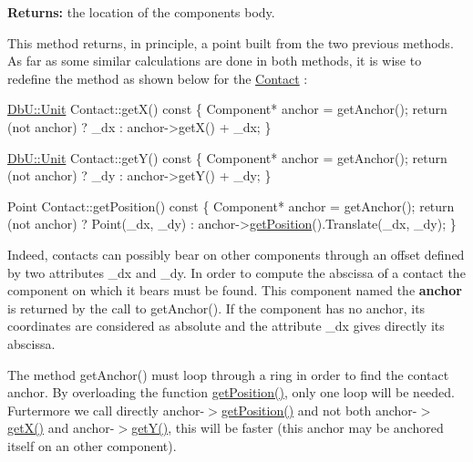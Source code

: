 {\bfseries Returns\+:} the location of the component\textquotesingle{}s body.

This method returns, in principle, a point built from the two previous methods. As far as some similar calculations are done in both methods, it is wise to redefine the method as shown below for the \hyperlink{classHurricane_1_1Contact}{Contact} \+: 
\begin{DoxyCode}
\hyperlink{group__DbUGroup_ga4fbfa3e8c89347af76c9628ea06c4146}{DbU::Unit} Contact::getX()\textcolor{keyword}{ const}
\textcolor{keyword}{}\{
  Component* anchor = getAnchor();
  \textcolor{keywordflow}{return} (not anchor) ? \_dx : anchor->getX() + \_dx;
\}
 

\hyperlink{group__DbUGroup_ga4fbfa3e8c89347af76c9628ea06c4146}{DbU::Unit} Contact::getY()\textcolor{keyword}{ const}
\textcolor{keyword}{}\{
  Component* anchor = getAnchor();
  \textcolor{keywordflow}{return} (not anchor) ? \_dy : anchor->getY() + \_dy;
\}
 

Point Contact::getPosition()\textcolor{keyword}{ const}
\textcolor{keyword}{}\{
  Component* anchor = getAnchor();
  \textcolor{keywordflow}{return} (not anchor) ? Point(\_dx, \_dy)
                      : anchor->\hyperlink{classHurricane_1_1Component_aa4e9a47c89fe701670ca34355195d519}{getPosition}().Translate(\_dx, \_dy);
\}
\end{DoxyCode}


Indeed, contacts can possibly bear on other components through an offset defined by two attributes \+\_\+dx and \+\_\+dy. In order to compute the abscissa of a contact the component on which it bears must be found. This component named the {\bfseries anchor} is returned by the call to get\+Anchor(). If the component has no anchor, its coordinates are considered as absolute and the attribute \+\_\+dx gives directly its abscissa.

The method get\+Anchor() must loop through a ring in order to find the contact anchor. By overloading the function \hyperlink{classHurricane_1_1Component_aa4e9a47c89fe701670ca34355195d519}{get\+Position()}, only one loop will be needed. Furtermore we call directly anchor-\/$>$\hyperlink{classHurricane_1_1Component_aa4e9a47c89fe701670ca34355195d519}{get\+Position()} and not both anchor-\/$>$\hyperlink{classHurricane_1_1Component_a0f8299ed73705fd4fbf56589dcc7e074}{get\+X()} and anchor-\/$>$\hyperlink{classHurricane_1_1Component_a727da3f127c3a7a0a09468219f98c3e6}{get\+Y()}, this will be faster (this anchor may be anchored itself on an other component). 


